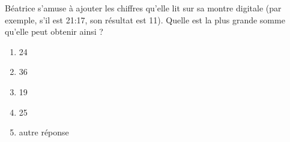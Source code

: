 Béatrice s'amuse à ajouter les chiffres qu'elle lit sur sa montre digitale (par exemple, s'il est
21:17, son résultat est 11). Quelle est la plus grande somme qu'elle peut obtenir ainsi ?
\begin{multicols}{5}
  \begin{enumerate}[A/]
  \item 24
  \item 36
  \item 19
  \item 25
  \item autre réponse
  \end{enumerate}
\end{multicols}